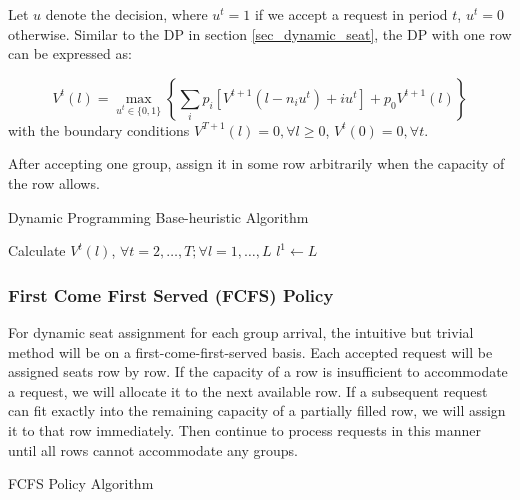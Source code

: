Let $u$ denote the decision, where $u^{t} = 1$ if we accept a request in period $t$, $u^{t} =0$ otherwise. Similar to the DP in section \ref{sec_dynamic_seat}, the DP with one row can be expressed as:

$$V^{t}(l) =  \max_{u^{t} \in \{0,1\}} \left\{ \sum_{i} p_i [V^{t+1}(l-n_i u^{t})+ i u^{t}] + p_0 V^{t+1}(l)\right\} $$
with the boundary conditions $V^{T+1}(l) =0, \forall l \geq 0$, $V^{t}(0) =0, \forall t$.

After accepting one group, assign it in some row arbitrarily when the capacity of the row allows.

\begin{algorithm}[H]
  \caption{Dynamic Programming Base-heuristic Algorithm}\label{algo_dp_heuris}
  Calculate $V^{t}(l)$, $\forall t =2, \ldots, T; \forall l = 1, \ldots, L$\;
  $l^{1} \gets L$\;
\end{algorithm}

\subsubsection*{First Come First Served (FCFS) Policy}
For dynamic seat assignment for each group arrival, the intuitive but trivial method will be on a first-come-first-served basis. Each accepted request will be assigned seats row by row. If the capacity of a row is insufficient to accommodate a request, we will allocate it to the next available row. If a subsequent request can fit exactly into the remaining capacity of a partially filled row, we will assign it to that row immediately. Then continue to process requests in this manner until all rows cannot accommodate any groups.

\begin{algorithm}[H]
  \caption{FCFS Policy Algorithm}\label{algo_fcfs}
\end{algorithm}





\newpage
